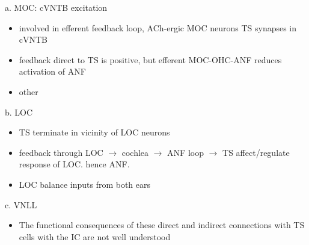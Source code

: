 a. MOC: cVNTB excitation

\begin{itemize}
\item involved in efferent feedback loop, ACh-ergic MOC neurons TS synapses in cVNTB \citep{WarrBeck:1996,Warr:1992,Warr:1982,VeneciaLibermanEtAl:2005,ThompsonThompson:1991,SmithJorisEtAl:1993}
\item feedback direct to TS is positive, but efferent MOC-OHC-ANF reduces activation of ANF \citep{WarrenLiberman:1989,WiederholdKiang:1970}
\item other \citep{RobertsonMulders:2000,WinterRobertsonEtAl:1989}
\end{itemize}


b. LOC

\begin{itemize}
\item TS terminate in vicinity of LOC neurons \citep{Warr:1982,ThompsonThompson:1988,ThompsonThompson:1991,DoucetRyugo:2003}
\item feedback through LOC $\rightarrow$ cochlea $\rightarrow$ ANF loop $\rightarrow$ TS affect/regulate response of LOC. hence ANF.
\item LOC balance inputs from both ears \citep{DarrowMaisonEtAl:2006}
\end{itemize}

c. VNLL

\begin{itemize}
\item The functional consequences of these direct and indirect connections with TS cells with the IC are not well understood
\end{itemize}

